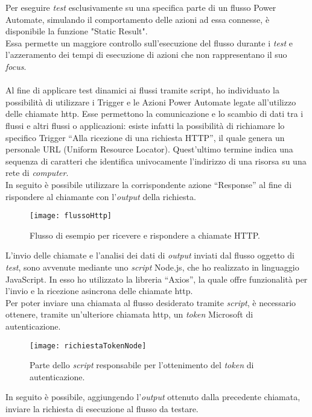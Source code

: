 \noindent Per eseguire \emph{test} esclusivamente su una specifica parte di un flusso Power Automate, simulando il comportamento delle azioni ad essa connesse, è disponibile la funzione "Static Result".\\
Essa permette un maggiore controllo sull'esecuzione del flusso durante i \emph{test} e l'azzeramento dei tempi di esecuzione di azioni che non rappresentano il suo \emph{focus}.\\\\
Al fine di applicare test dinamici ai flussi tramite script, ho individuato la possibilità di utilizzare i Trigger e le Azioni Power Automate legate all'utilizzo delle chiamate \gls{http}.
Esse permettono la comunicazione e lo scambio di dati tra i flussi e altri flussi o applicazioni: esiste infatti la possibilità di richiamare lo specifico Trigger “Alla ricezione di una richiesta HTTP”, il quale genera un personale URL (Uniform Resource Locator).
Quest'ultimo termine indica una sequenza di caratteri che identifica univocamente l'indirizzo di una risorsa su una rete di \emph{computer}.\\
In seguito è possibile utilizzare la corrispondente azione “Response” al fine di rispondere al chiamante con l'\emph{output} della richiesta.\\
\begin{figure}[htbp] 
    \centering 
    \texttt{[image: flussoHttp]} 
    \caption{Flusso di esempio per ricevere e rispondere a chiamate HTTP.}
    \label{fig:flussoHttp}
\end{figure}
\newpage \noindent L'invio delle chiamate e l'analisi dei dati di \emph{output} inviati dal flusso oggetto di \emph{test}, sono avvenute mediante uno \emph{script} Node.js, che ho realizzato in linguaggio JavaScript.
In esso ho utilizzato la libreria “Axios”, la quale offre funzionalità per l'invio e la ricezione asincrona delle chiamate \gls{http}.\\
Per poter inviare una chiamata al flusso desiderato tramite \emph{script}, è necessario ottenere, tramite un'ulteriore chiamata \gls{http}, un \emph{token} Microsoft di autenticazione.
\begin{figure}[htbp] 
    \centering 
    \texttt{[image: richiestaTokenNode]} 
    \caption{Parte dello \emph{script} responsabile per l'ottenimento del \emph{token} di autenticazione.}
    \label{fig:richiestaTokenNode}
\end{figure}
\newline In seguito è possibile, aggiungendo l'\emph{output} ottenuto dalla precedente chiamata, inviare la richiesta di esecuzione al flusso da testare.\\

